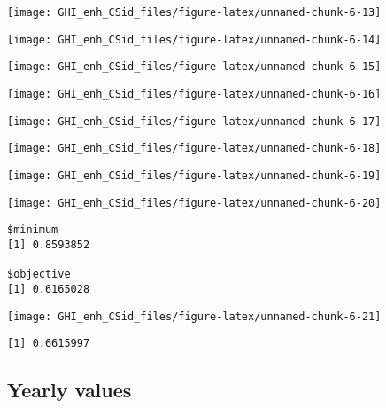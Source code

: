 \documentclass[
  10pt,
  a4paper,oneside]{article}
\begin{document}
\begin{center}\texttt{[image: GHI\_enh\_CSid\_files/figure-latex/unnamed-chunk-6-13]} \end{center}

\begin{center}\texttt{[image: GHI\_enh\_CSid\_files/figure-latex/unnamed-chunk-6-14]} \end{center}

\begin{center}\texttt{[image: GHI\_enh\_CSid\_files/figure-latex/unnamed-chunk-6-15]} \end{center}

\begin{center}\texttt{[image: GHI\_enh\_CSid\_files/figure-latex/unnamed-chunk-6-16]} \end{center}

\begin{center}\texttt{[image: GHI\_enh\_CSid\_files/figure-latex/unnamed-chunk-6-17]} \end{center}

\begin{center}\texttt{[image: GHI\_enh\_CSid\_files/figure-latex/unnamed-chunk-6-18]} \end{center}

\begin{center}\texttt{[image: GHI\_enh\_CSid\_files/figure-latex/unnamed-chunk-6-19]} \end{center}

\begin{center}\texttt{[image: GHI\_enh\_CSid\_files/figure-latex/unnamed-chunk-6-20]} \end{center}

\begin{verbatim}
$minimum
[1] 0.8593852

$objective
[1] 0.6165028
\end{verbatim}

\begin{center}\texttt{[image: GHI\_enh\_CSid\_files/figure-latex/unnamed-chunk-6-21]} \end{center}

\begin{verbatim}
[1] 0.6615997
\end{verbatim}

\subsection{Yearly values}\label{yearly-values}
\end{document}
